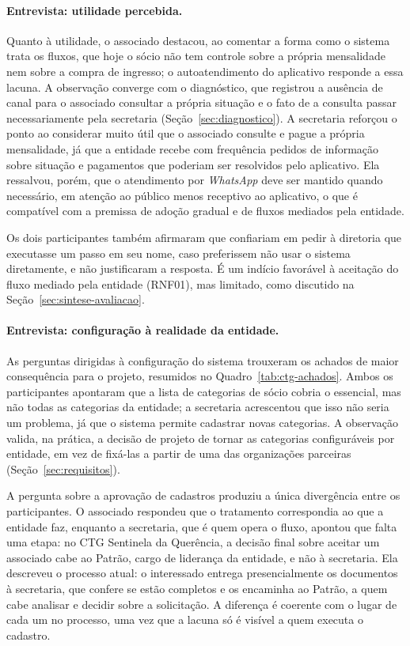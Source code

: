\documentclass[12pt,a4paper]{article}
\begin{document}
\paragraph{Entrevista: utilidade percebida.} Quanto à utilidade, o associado destacou, ao comentar a
forma como o sistema trata os fluxos, que hoje o sócio não tem controle sobre a própria mensalidade
nem sobre a compra de ingresso; o autoatendimento do aplicativo responde a essa lacuna. A observação
converge com o diagnóstico, que registrou a ausência de canal para o associado consultar a própria
situação e o fato de a consulta passar necessariamente pela secretaria
(Seção~\ref{sec:diagnostico}). A secretaria reforçou o ponto ao considerar muito útil que o associado
consulte e pague a própria mensalidade, já que a entidade recebe com frequência pedidos de
informação sobre situação e pagamentos que poderiam ser resolvidos pelo aplicativo. Ela ressalvou,
porém, que o atendimento por \textit{WhatsApp} deve ser mantido quando necessário, em atenção ao
público menos receptivo ao aplicativo, o que é compatível com a premissa de adoção gradual e de
fluxos mediados pela entidade.

Os dois participantes também afirmaram que confiariam em pedir à diretoria que executasse um passo em
seu nome, caso preferissem não usar o sistema diretamente, e não justificaram a resposta. É um indício favorável
à aceitação do fluxo mediado pela entidade (RNF01), mas limitado, como discutido na
Seção~\ref{sec:sintese-avaliacao}.

\paragraph{Entrevista: configuração à realidade da entidade.} As perguntas dirigidas à
configuração do sistema trouxeram os achados de maior consequência para o projeto, resumidos no
Quadro~\ref{tab:ctg-achados}. Ambos os participantes apontaram que a lista de categorias de sócio
cobria o essencial, mas não todas as categorias da entidade; a secretaria acrescentou que isso não
seria um problema, já que o sistema permite cadastrar novas categorias. A observação valida, na
prática, a decisão de projeto de tornar as categorias configuráveis por entidade, em vez de fixá-las
a partir de uma das organizações parceiras (Seção~\ref{sec:requisitos}).

A pergunta sobre a aprovação de cadastros produziu a única divergência entre os participantes. O
associado respondeu que o tratamento correspondia ao que a entidade faz, enquanto a secretaria, que
é quem opera o fluxo, apontou que falta uma etapa: no CTG Sentinela da Querência, a decisão final
sobre aceitar um associado cabe ao Patrão, cargo de liderança da entidade, e não à secretaria. Ela
descreveu o processo atual: o interessado entrega presencialmente os documentos à secretaria, que
confere se estão completos e os encaminha ao Patrão, a quem cabe analisar e decidir sobre a
solicitação. A diferença é coerente com o lugar de cada um no processo, uma vez que a lacuna só é
visível a quem executa o cadastro.
\end{document}
